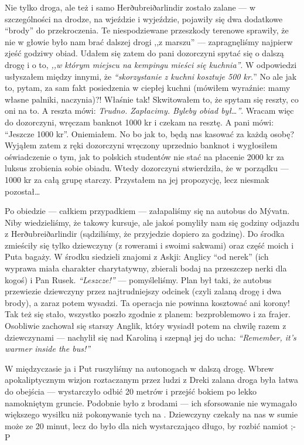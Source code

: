 Nie tylko droga, ale też i samo Herðubreiðarlindir zostało zalane --- w szczególności na drodze, na wjeździe i wyjeździe, pojawiły się dwa dodatkowe “brody” do przekroczenia. Te niespodziewane przeszkody terenowe sprawiły, że nie w głowie było nam brać dalszej drogi ,,z marszu'' --- zapragnęliśmy najpierw zjeść godziwy obiad. Udałem się zatem do pani dozorczyni spytać się o dalszą drogę i o to, \emph{,,w którym miejscu na kempingu mieści się kuchnia''}. W odpowiedzi usłyszałem między innymi, że \emph{“skorzystanie z kuchni kosztuje 500 kr.}” No ale jak to, pytam, za sam fakt posiedzenia w ciepłej kuchni (mówiłem wyraźnie: mamy własne palniki, naczynia)?! Właśnie tak! Skwitowałem to, że spytam się reszty, co oni na to. A reszta mówi: \emph{Trudno. Zapłacimy. Byleby obiad był…''}. Wracam więc do dozorczyni, wręczam banknot 1000 kr i czekam na resztę. A pani mówi: “Jeszcze 1000 kr”. Oniemiałem. No bo jak to, będą nas kasować za każdą osobę? Wyjąłem zatem z ręki dozorczyni wręczony uprzednio banknot i wygłosiłem oświadczenie o tym, jak to polskich studentów nie stać na płacenie 2000 kr za luksus zrobienia sobie obiadu. Wtedy dozorczyni stwierdziła, że w porządku --- 1000 kr za całą grupę starczy. Przystałem na jej propozycję, lecz niesmak pozostał…

Po obiedzie --- całkiem przypadkiem --- załapaliśmy się na autobus do Mývatn. Niby wiedzieliśmy, że takowy kursuje, ale jakoś pomyliły nam się godziny odjazdu z Herðubreiðarlindir (sądziliśmy, że przyjedzie dopiero za godzinę). Do środka zmieściły się tylko dziewczyny (z rowerami i swoimi sakwami) oraz część moich i Puta bagaży. W środku siedzieli znajomi z Askji: Anglicy “od nerek” (ich wyprawa miała charakter charytatywny, zbierali bodaj na przeszczep nerki dla kogoś) i Pan Rusek. \emph{“Leszcze!”} --- pomyśleliśmy. Plan był taki, że autobus przewiezie dziewczyny przez najtrudniejszy odcinek (czyli zalaną drogę i dwa brody), a zaraz potem wysadzi. Ta operacja nie powinna kosztować ani korony! Tak też się stało, wszystko poszło zgodnie z planem: bezproblemowo i za frajer. Osobliwie zachował się starszy Anglik, który wysiadł potem na chwilę razem z dziewczynami --- nachylił się nad Karoliną i szepnął jej do ucha: \emph{“Remember, it’s warmer inside the bus!”}

W międzyczasie ja i Put ruszyliśmy na autonogach w dalszą drogę. Wbrew apokaliptycznym wizjon roztaczanym przez ludzi z Dreki zalana droga była łatwa do obejścia --- wystarczyło odbić 20 metrów i przejść bokiem po lekko namokniętym gruncie. Podobnie było z brodami --- ich sforsowanie nie wymagało większego wysiłku niż pokonywanie tych na . Dziewczyny czekały na nas w sumie może ze 20 minut, lecz do było dla nich wystarczająco długo, by rozbić namiot ;-P

